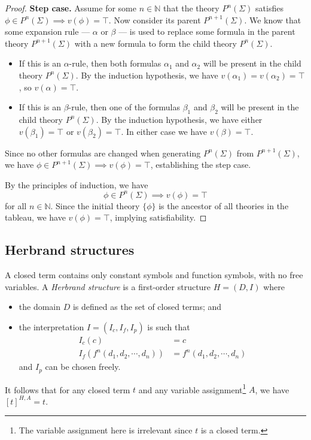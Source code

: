 \begin{proof}
    \textbf{Step case.} Assume for some \(n \in \mathbb{N}\) that the theory \(P^n (\Sigma)\) satisfies \(\phi \in P^n (\Sigma) \implies v(\phi) = \top\). Now consider its parent \(P^{n+1}(\Sigma)\). We know that some expansion rule --- \(\alpha\) or \(\beta\) --- is used to replace some formula in the parent theory \(P^{n+1}(\Sigma)\) with a new formula to form the child theory \(P^n (\Sigma)\).
    \begin{itemize}
        \item If this is an \(\alpha\)-rule, then both formulas \(\alpha_1\) and \(\alpha_2\) will be present in the child theory \(P^n (\Sigma)\). By the induction hypothesis, we have \(v(\alpha_1) = v(\alpha_2) = \top\), so \(v(\alpha) = \top\).
        \item If this is an \(\beta\)-rule, then one of the formulas \(\beta_1\) and \(\beta_2\) will be present in the child theory \(P^n (\Sigma)\). By the induction hypothesis, we have either \(v(\beta_1) = \top\) or \(v(\beta_2) = \top\). In either case we have \(v(\beta) = \top\).
    \end{itemize}
    Since no other formulas are changed when generating \(P^n (\Sigma)\) from \(P^{n+1} (\Sigma)\), we have \(\phi \in P^{n+1} (\Sigma) \implies v(\phi) = \top\), establishing the step case.

    By the principles of induction, we have
    \[\phi \in P^n (\Sigma) \implies v(\phi) = \top\]
    for all \(n \in \mathbb{N}\). Since the initial theory \(\{\phi\}\) is the ancestor of all theories in the tableau, we have \(v(\phi) = \top\), implying satisfiability.
\end{proof}



\subsection{Herbrand structures}

A closed term contains only constant symbols and function symbols, with no free variables. A \emph{Herbrand structure} is a first-order structure \(H = (D, I)\) where
%
\begin{itemize}
    \item the domain \(D\) is defined as the set of closed terms; and
    \item the interpretation \(I = (I_c, I_f, I_p)\) is such that
    \begin{align*}
        I_c (c) &= c \tag{interpret each constant symbol as the symbol itself}\\
        I_f(f^n (d_1, d_2, \cdots, d_n)) &= f^n (d_1, d_2, \cdots, d_n) \tag{interpret each function as the string itself}
    \end{align*}
    and \(I_p\) can be chosen freely.
\end{itemize}
%
It follows that for any closed term \(t\) and any variable assignment\footnote{The variable assignment here is irrelevant since \(t\) is a closed term.} \(A\), we have \([t]^{H, A} = t\).

